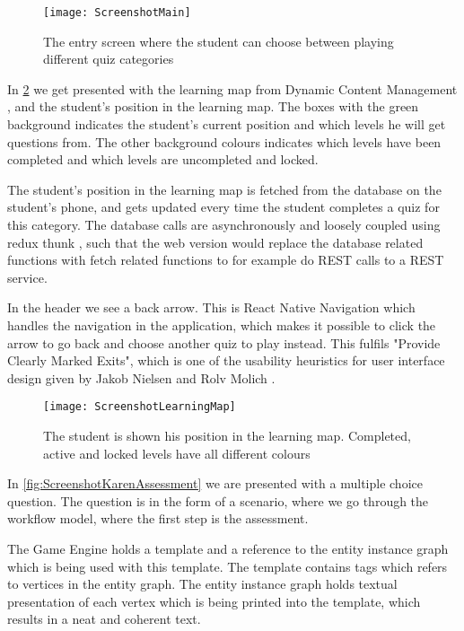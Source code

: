 \begin{figure}[h!]
	\label{fig:ScreenshotMain}
	\texttt{[image: ScreenshotMain]}
	\caption {The entry screen where the student can choose between playing different quiz categories}
\end{figure}

In \ref{fig:ScreenshotLearningMap} we get presented with the learning map from Dynamic Content Management \parencite{Eide2008}, and the student's position in the learning map. The boxes with the green background indicates the student's current position and which levels he will get questions from. The other background colours indicates which levels have been completed and which levels are uncompleted and locked. 

The student's position in the learning map is fetched from the database on the student's phone, and gets updated every time the student completes a quiz for this category. The database calls are asynchronously and loosely coupled using redux thunk \parencite{ReduxJS-thunk}, such that the web version would replace the database related functions with fetch related functions to for example do REST calls to a REST service. 

In the header we see a back arrow. This is React Native Navigation \parencite{Wix} which handles the navigation in the application, which makes it possible to click the arrow to go back and choose another quiz to play instead. This fulfils "Provide Clearly Marked Exits", which is one of the usability heuristics for user interface design given by Jakob Nielsen and Rolv Molich \parencite{Molich1990}.

\begin{figure}[h!]
	\label{fig:ScreenshotLearningMap}
	\texttt{[image: ScreenshotLearningMap]}
	\caption {The student is shown his position in the learning map. Completed, active and locked levels have all different colours}
\end{figure}

In \ref{fig:ScreenshotKarenAssessment} we are presented with a multiple choice question. The question is in the form of a scenario, where we go through the workflow model, where the first step is the assessment.  

The Game Engine holds a template and a reference to the entity instance graph which is being used with this template. The template contains tags which refers to vertices in the entity graph. The entity instance graph holds textual presentation of each vertex which is being printed into the template, which results in a neat and coherent text. 

